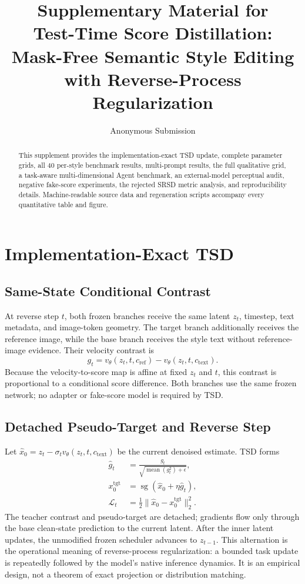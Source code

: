 \documentclass[letterpaper]{article}
\title{Supplementary Material for\\Test-Time Score Distillation:
Mask-Free Semantic Style Editing with Reverse-Process Regularization}
\author{Anonymous Submission}
\newcommand{\sg}{\operatorname{sg}}
\begin{document}
\maketitle

\begin{abstract}
This supplement provides the implementation-exact TSD update, complete
parameter grids, all 40 per-style benchmark results, multi-prompt results, the
full qualitative grid, a task-aware multi-dimensional Agent benchmark, an
external-model perceptual audit, negative fake-score experiments, the rejected SRSD metric analysis, and
reproducibility details. Machine-readable source data and regeneration scripts
accompany every quantitative table and figure.
\end{abstract}

\section{Implementation-Exact TSD}

\subsection{Same-State Conditional Contrast}

At reverse step $t$, both frozen branches receive the same latent $z_t$,
timestep, text metadata, and image-token geometry. The target branch additionally
receives the reference image, while the base branch receives the style text
without reference-image evidence. Their velocity contrast is
\begin{equation}
g_t = v_\theta(z_t,t,c_{\mathrm{ref}})-v_\theta(z_t,t,c_{\mathrm{text}}).
\label{eq:supp-contrast}
\end{equation}
Because the velocity-to-score map is affine at fixed $z_t$ and $t$, this
contrast is proportional to a conditional score difference. Both branches use
the same frozen network; no adapter or fake-score model is required by TSD.

\subsection{Detached Pseudo-Target and Reverse Step}

Let $\hat x_0=z_t-\sigma_t v_\theta(z_t,t,c_{\mathrm{text}})$ be the current
denoised estimate. TSD forms
\begin{align}
\widehat g_t &= \frac{g_t}{\sqrt{\operatorname{mean}(g_t^2)+\epsilon}},\\
x_0^{\mathrm{tgt}} &= \sg\!\left(\hat x_0+\eta\widehat g_t\right),\\
\mathcal L_t &= \tfrac12\lVert \hat x_0-x_0^{\mathrm{tgt}}\rVert_2^2.
\end{align}
The teacher contrast and pseudo-target are detached; gradients flow only
through the base clean-state prediction to the current latent. After the inner
latent updates, the unmodified frozen scheduler advances to $z_{t-1}$. This
alternation is the operational meaning of reverse-process regularization: a
bounded task update is repeatedly followed by the model's native inference
dynamics. It is an empirical design, not a theorem of exact projection or
distribution matching.
\end{document}
